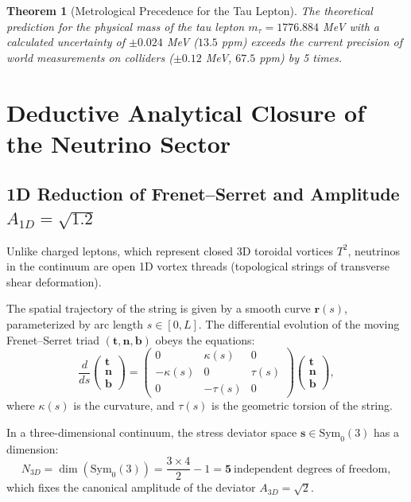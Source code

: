 \documentclass[12pt,a4paper]{article}
\newtheorem{theorem}{Theorem}
\begin{document}
	\begin{theorem}[Metrological Precedence for the Tau Lepton]
	The theoretical prediction for the physical mass of the tau lepton $m_\tau = 1776.884$ MeV with a calculated uncertainty of $\pm 0.024$ MeV ($13.5$ ppm) exceeds the current precision of world measurements on colliders ($\pm 0.12$ MeV, $67.5$ ppm) by 5 times.
	\end{theorem}
			
\section{Deductive Analytical Closure of the Neutrino Sector}
			
	\subsection{1D Reduction of Frenet--Serret and Amplitude $A_{1D} = \sqrt{1.2}$}
	Unlike charged leptons, which represent closed 3D toroidal vortices $T^2$, neutrinos in the continuum are open 1D vortex threads (topological strings of transverse shear deformation).
			
	The spatial trajectory of the string is given by a smooth curve $\mathbf{r}(s)$, parameterized by arc length $s \in [0, L]$. The differential evolution of the moving Frenet--Serret triad $(\mathbf{t}, \mathbf{n}, \mathbf{b})$ obeys the equations:
	\begin{equation}
	\frac{d}{ds} \begin{pmatrix} \mathbf{t} \\ \mathbf{n} \\ \mathbf{b} \end{pmatrix} = \begin{pmatrix} 0 & \kappa(s) & 0 \\ -\kappa(s) & 0 & \tau(s) \\ 0 & -\tau(s) & 0 \end{pmatrix} \begin{pmatrix} \mathbf{t} \\ \mathbf{n} \\ \mathbf{b} \end{pmatrix},
	\end{equation}
	where $\kappa(s)$ is the curvature, and $\tau(s)$ is the geometric torsion of the string.
			
	In a three-dimensional continuum, the stress deviator space $\mathbf{s} \in \mathrm{Sym}_0(3)$ has a dimension:
	\begin{equation}
	N_{3D} = \dim(\mathrm{Sym}_0(3)) = \frac{3 \times 4}{2} - 1 = \mathbf{5} \ \text{independent degrees of freedom},
	\end{equation}
	which fixes the canonical amplitude of the deviator $A_{3D} = \sqrt{2}$.
			
\end{document}
